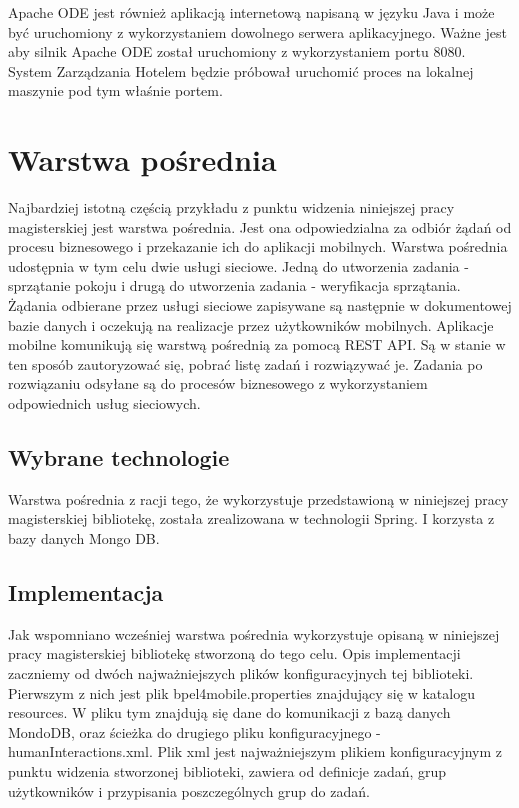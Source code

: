 Apache ODE jest również aplikacją internetową napisaną w języku Java i może być uruchomiony z wykorzystaniem dowolnego serwera aplikacyjnego. Ważne jest aby silnik Apache ODE został uruchomiony z wykorzystaniem portu 8080. System Zarządzania Hotelem będzie próbował uruchomić proces na lokalnej maszynie pod tym właśnie portem.  




\section{Warstwa pośrednia }
\label{sec:exampleMiddleware}

Najbardziej istotną częścią przykładu z punktu widzenia niniejszej pracy magisterskiej jest warstwa pośrednia. Jest ona odpowiedzialna za odbiór  żądań od procesu biznesowego i przekazanie ich do aplikacji mobilnych. Warstwa pośrednia udostępnia w tym celu dwie usługi sieciowe. Jedną do utworzenia zadania - sprzątanie pokoju i drugą do utworzenia zadania - weryfikacja sprzątania. Żądania odbierane przez usługi sieciowe zapisywane są następnie w dokumentowej bazie danych i oczekują na realizacje przez użytkowników mobilnych. Aplikacje mobilne komunikują się warstwą pośrednią za pomocą REST API. Są w stanie w ten sposób zautoryzować się, pobrać listę zadań i rozwiązywać je. Zadania po rozwiązaniu odsyłane są do procesów biznesowego z wykorzystaniem odpowiednich usług sieciowych. 

\subsection{Wybrane technologie}
Warstwa pośrednia z racji tego, że wykorzystuje przedstawioną w niniejszej pracy magisterskiej bibliotekę, została zrealizowana w technologii Spring. I korzysta z bazy danych Mongo DB.

\subsection{Implementacja}

Jak wspomniano wcześniej warstwa pośrednia wykorzystuje opisaną w niniejszej pracy magisterskiej bibliotekę stworzoną do tego celu. Opis implementacji zaczniemy od dwóch najważniejszych plików konfiguracyjnych tej biblioteki. Pierwszym z nich jest plik bpel4mobile.properties znajdujący się w katalogu resources. W pliku tym znajdują się dane do komunikacji z bazą danych MondoDB, oraz ścieżka do drugiego pliku konfiguracyjnego - humanInteractions.xml. Plik xml jest najważniejszym plikiem konfiguracyjnym z punktu widzenia stworzonej biblioteki, zawiera od definicje zadań, grup użytkowników i przypisania poszczególnych grup do zadań. 


